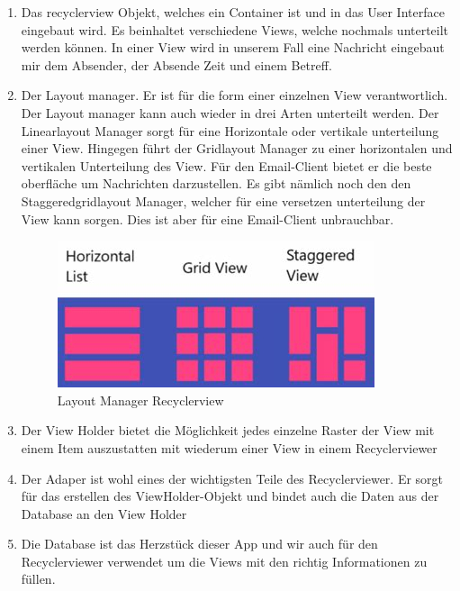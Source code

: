 \documentclass[a4paper,11pt]{article}
\begin{document}
\begin{enumerate}


    \item Das recyclerview Objekt, welches ein Container ist und in das User Interface eingebaut wird. 
Es beinhaltet verschiedene Views, welche nochmals unterteilt werden können. In einer View wird in unserem 
Fall eine Nachricht eingebaut mir dem Absender, der Absende Zeit und einem Betreff. 

    \item Der Layout manager. Er ist für die form einer einzelnen View verantwortlich. 
Der Layout manager kann auch wieder in drei Arten unterteilt werden. Der Linearlayout Manager sorgt für eine 
Horizontale oder vertikale unterteilung einer View. Hingegen führt der Gridlayout Manager zu einer horizontalen 
und vertikalen Unterteilung des View. Für den Email-Client bietet er die  
beste oberfläche um Nachrichten darzustellen. Es gibt nämlich noch den den Staggeredgridlayout Manager, welcher 
für eine versetzen unterteilung der View kann sorgen. Dies ist aber für eine Email-Client unbrauchbar. 

\begin{figure}[H]
    \centering
    \includegraphics[width=.4\textwidth]{media/RecyclerviewLayoutManagerCropt.jpeg}
    \caption{Layout Manager Recyclerview \cite{LayoutManagerPicture}}
\end{figure}

    \item Der View Holder bietet die Möglichkeit jedes einzelne Raster der View mit einem Item auszustatten mit wiederum einer View in einem Recyclerviewer

    \item Der Adaper ist wohl eines der wichtigsten Teile des Recyclerviewer. Er sorgt für das erstellen des ViewHolder-Objekt und
bindet auch die Daten aus der Database an den View Holder

    \item Die Database ist das Herzstück dieser App und wir auch für den Recyclerviewer verwendet um die 
Views mit den richtig Informationen zu füllen. 

\end{enumerate}
\end{document}

